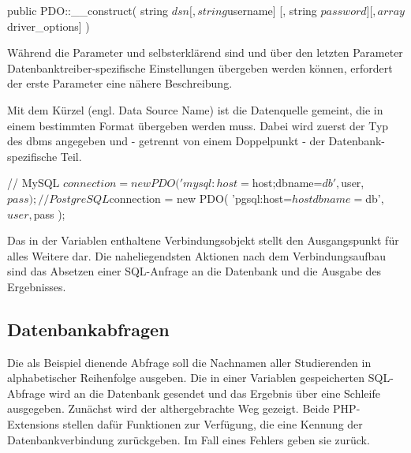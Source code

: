 \begin{phpcode}
public PDO::__construct(
  string $dsn
  [, string $username]
  [, string $password]
  [, array $driver_options]
)
\end{phpcode}

Während die Parameter  und  selbsterklärend sind und über den letzten Parameter  Datenbanktreiber-spezifische Einstellungen übergeben werden können, erfordert der erste Parameter eine nähere Beschreibung.

Mit dem Kürzel  (engl. Data Source Name) ist die Datenquelle gemeint, die in einem bestimmten Format übergeben werden muss. Dabei wird zuerst der Typ des \gls{dbms} angegeben und - getrennt von einem Doppelpunkt - der Datenbank-spezifische Teil.

\begin{phpcode}
// MySQL
$connection = new PDO(
  'mysql:host=$host;dbname=$db',
  $user,
  $pass
);

// PostgreSQL
$connection = new PDO(
  'pgsql:host=$host dbname=$db',
  $user,
  $pass
);
\end{phpcode}

Das in der Variablen  enthaltene Verbindungsobjekt stellt den Ausgangspunkt für alles Weitere dar. Die naheliegendsten Aktionen nach dem Verbindungsaufbau sind das Absetzen einer SQL-Anfrage an die Datenbank und die Ausgabe des Ergebnisses.

\subsection{Datenbankabfragen}
Die als Beispiel dienende Abfrage soll die Nachnamen aller Studierenden in alphabetischer Reihenfolge ausgeben. Die in einer Variablen gespeicherten SQL-Abfrage wird an die Datenbank gesendet und das Ergebnis über eine Schleife ausgegeben. Zunächst wird der althergebrachte Weg gezeigt. Beide PHP-Extensions stellen dafür  Funktionen zur Verfügung, die eine Kennung der Datenbankverbindung zurückgeben. Im Fall eines Fehlers geben sie  zurück.


